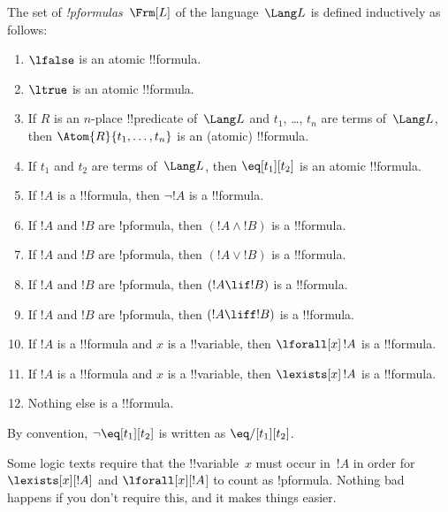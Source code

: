 \documentclass[../../include/open-logic-section]{subfiles}
\begin{document}
\begin{defn}[Formula]
The set of \emph{!p{formulas}}~$\Frm[L]$ of the language~$\Lang L$
is defined inductively as follows:
\begin{enumerate}
\item $\lfalse$ is an atomic !!{formula}.
\item $\ltrue$ is an atomic !!{formula}.
\item If $R$ is an $n$-place !!{predicate} of~$\Lang L$ and $t_1$, \dots,
  $t_n$ are terms of~$\Lang L$, then $\Atom{R}{t_1,\ldots, t_n}$ is an
  (atomic) !!{formula}.
\item If $t_1$ and $t_2$ are terms of~$\Lang L$, then $\eq[t_1][t_2]$
  is an atomic !!{formula}.
\item If $!A$ is a !!{formula}, then $\lnot !A$ is a !!{formula}.
\item If $!A$ and $!B$ are !p{formula}, then $(!A \land !B)$ is a !!{formula}.
\item If $!A$ and $!B$ are !p{formula}, then $(!A \lor !B)$ is a !!{formula}.
\item If $!A$ and $!B$ are !p{formula}, then $(!A \lif !B)$ is a !!{formula}.
\item If $!A$ and $!B$ are !p{formula}, then $(!A \liff !B)$ is a !!{formula}.
\item If $!A$ is a !!{formula} and $x$ is a !!{variable}, then $\lforall[x]\,
  !A$ is a !!{formula}.
\item If $!A$ is a !!{formula} and $x$ is a !!{variable}, then $\lexists[x]\,
  !A$ is a !!{formula}.
\item Nothing else is a !!{formula}.
\end{enumerate}
\end{defn}

\begin{explain}
By convention, $\lnot \eq[t_1][t_2]$ is written as $\eq/[t_1][t_2]$.
\end{explain}

\begin{intro}
Some logic texts require that the !!{variable}~$x$ must occur in~$!A$ in
order for $\lexists[x][!A]$ and $\lforall[x][!A$] to count as
!p{formula}.  Nothing bad happens if you don't require this, and it makes
things easier.
\end{intro}
\end{document}
